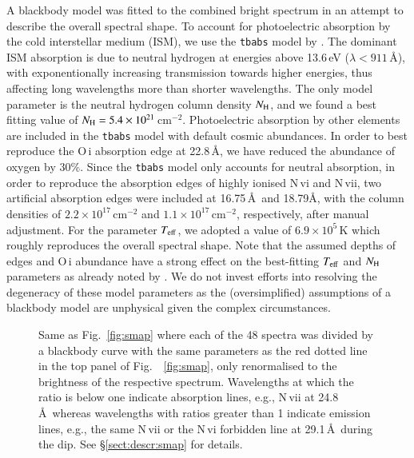 \documentclass{aa}
\begin{document}
A blackbody model was fitted to the combined bright spectrum in
an attempt to describe the overall spectral shape.
To account for photoelectric absorption by the cold interstellar
medium (ISM), we use the {\tt tbabs} model by \cite{wilms00}. The dominant
ISM absorption is due to neutral hydrogen at energies above
13.6\,eV ($\lambda<911$\,\AA), with exponentionally increasing transmission
towards higher energies, thus affecting long wavelengths more than shorter
wavelengths. The only model parameter is the neutral hydrogen
column density $N_{\rm H}$, and we found a best fitting value of
$N_{\rm H}=5.4\times 10^{21}$\,cm$^{-2}$.
Photoelectric absorption by other elements are included in the
{\tt tbabs} model with default cosmic abundances.
In order to best reproduce the O\,{\sc i} absorption edge at 22.8\,\AA,
we have reduced the abundance of oxygen by 30\%. Since the {\tt tbabs}
model only accounts for neutral absorption, in order to reproduce the
absorption edges of highly ionised N\,{\sc vi} and N\,{\sc vii},
two artificial absorption edges were included at 16.75\,\AA\ and
18.79\AA, with the column densities of $2.2\times 10^{17}$\,cm$^{-2}$
and $1.1\times 10^{17}$\,cm$^{-2}$, respectively, after manual adjustment.
For the parameter $T_{\rm eff}$, we adopted a value of
$6.9\times 10^5$\,K which roughly reproduces the overall spectral shape.
Note that the assumed depths of edges and O\,{\sc i} abundance have a
strong effect on the best-fitting $T_{\rm eff}$ and $N_{\rm H}$
parameters as already noted by \cite{page20}. We do not invest efforts
into resolving the degeneracy of these model parameters as the
(oversimplified) assumptions of a blackbody model are unphysical given
the complex circumstances.\\

\begin{figure*}[!ht]
        \caption{\label{fig:smap_bbnorm}Same as Fig.~\ref{fig:smap} where each
of the 48 spectra was divided by a blackbody curve with the same parameters
as the red dotted line in the top panel of Fig.~~\ref{fig:smap}, only
renormalised to the brightness of the respective spectrum. Wavelengths at
which the ratio is below one indicate absorption lines, e.g., N\,{\sc vii}
at 24.8\,\AA\ whereas wavelengths with ratios greater than 1 indicate
emission lines, e.g., the same N\,{\sc vii} or the N\,{\sc vi} forbidden
line at 29.1\,\AA\ during the dip. See \S\ref{sect:descr:smap} for details.
}
\end{figure*}
\end{document}

